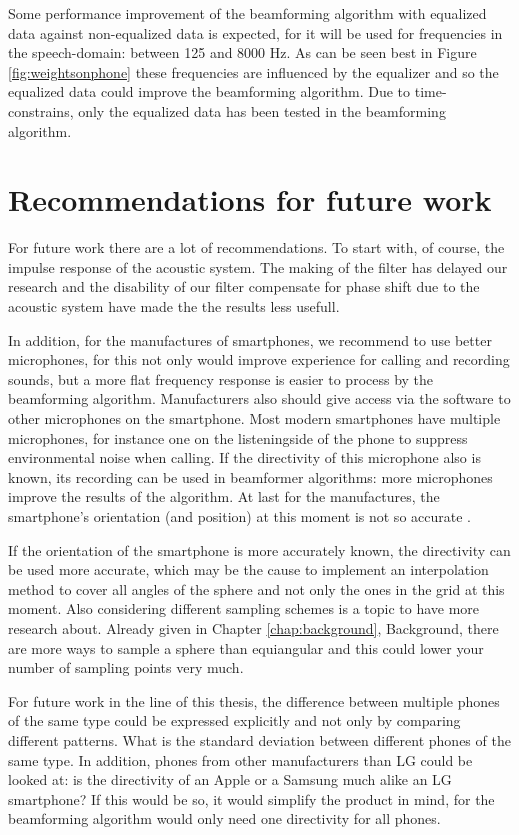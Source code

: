 Some performance improvement of the beamforming algorithm with equalized data against non-equalized data is expected, for it will be used for frequencies in the speech-domain: between 125 and 8000 Hz.
As can be seen best in Figure \ref{fig:weightsonphone} these frequencies are influenced by the equalizer and so the equalized data could improve the beamforming algorithm.
Due to time-constrains, only the equalized data has been tested in the beamforming algorithm.

\clearpage
\section{Recommendations for future work}
For future work there are a lot of recommendations.
To start with, of course, the impulse response of the acoustic system.
The making of the filter has delayed our research and the disability of our filter compensate for phase shift due to the acoustic system have made the the results less usefull.

In addition, for the manufactures of smartphones, we recommend to use better microphones, for this not only would improve experience for calling and recording sounds, but a more flat frequency response is easier to process by the beamforming algorithm.
Manufacturers also should give access via the software to other microphones on the smartphone.
Most modern smartphones have multiple microphones, for instance one on the listeningside of the phone to suppress environmental noise when calling.
If the directivity of this microphone also is known, its recording can be used in beamformer algorithms: more microphones improve the results of the algorithm.
At last for the manufactures, the smartphone's orientation (and position) at this moment is not so accurate \cite{BAP:RoySjoerd}.

If the orientation of the smartphone is more accurately known, the directivity can be used more accurate, which may be the cause to implement an interpolation method to cover all angles of the sphere and not only the ones in the grid at this moment.
Also considering different sampling schemes is a topic to have more research about.
Already given in Chapter \ref{chap:background}, Background, there are more ways to sample a sphere than equiangular and this could lower your number of sampling points very much.

For future work in the line of this thesis, the difference between multiple phones of the same type could be expressed explicitly and not only by comparing different patterns.
What is the standard deviation between different phones of the same type.
In addition, phones from other manufacturers than LG could be looked at: is the directivity of an Apple or a Samsung much alike an LG smartphone?
If this would be so, it would simplify the product in mind, for the beamforming algorithm would only need one directivity for all phones.

